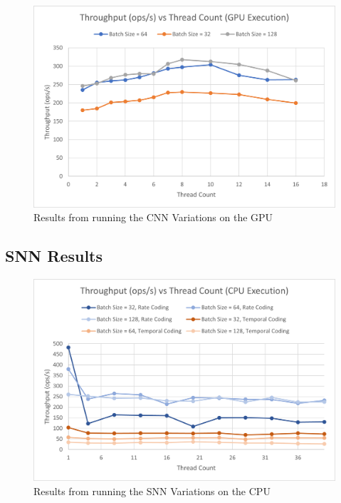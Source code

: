 \documentclass[journal]{IEEEtran}
\begin{document}
\begin{figure}[!t]
\centering
\includegraphics[width=\linewidth]{CNN_GPU_Throughput.png}
\caption{Results from running the CNN Variations on the GPU}
\label{fig_cnn_gpu}
\end{figure}



\subsection{SNN Results}


\begin{figure}[!t]
\centering
\includegraphics[width=\linewidth]{snn_results1.png}
\caption{Results from running the SNN Variations on the CPU}
\label{fig_snn_cpu}
\end{figure}
\end{document}
